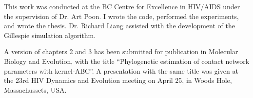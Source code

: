 This work was conducted at the BC Centre for Excellence in HIV/AIDS under the
supervision of Dr. Art Poon. I wrote the code, performed the experiments, and
wrote the thesis. Dr. Richard Liang assisted with the development of the
Gillespie simulation algorithm.

A version of chapters 2 and 3 has been submitted for publication in Molecular
Biology and Evolution, with the title ``Phylogenetic estimation of contact
network parameters with kernel-ABC''. A presentation with the same title was
given at the 23rd HIV Dynamics and Evolution meeting on April 25, in Woods
Hole, Massachussets, USA.
